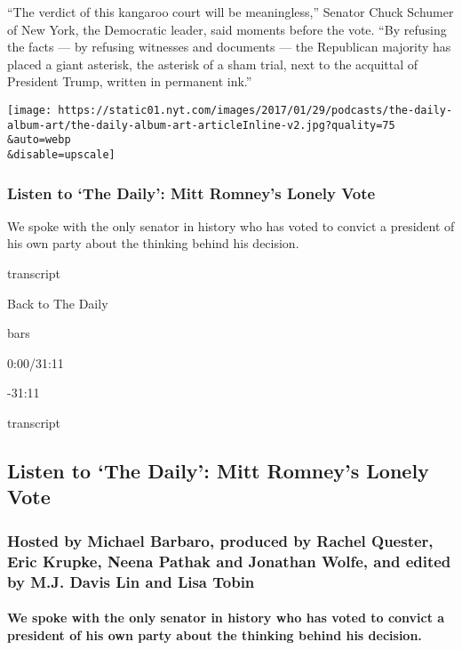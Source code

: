 ``The verdict of this kangaroo court will be meaningless,'' Senator
Chuck Schumer of New York, the Democratic leader, said moments before
the vote. ``By refusing the facts --- by refusing witnesses and
documents --- the Republican majority has placed a giant asterisk, the
asterisk of a sham trial, next to the acquittal of President Trump,
written in permanent ink.''

\texttt{[image: https://static01.nyt.com/images/2017/01/29/podcasts/the-daily-album-art/the-daily-album-art-articleInline-v2.jpg?quality=75\\\&auto=webp\\\&disable=upscale]}

\hypertarget{listen-to-the-daily-mitt-romneys-lonely-vote}{%
\subsubsection{Listen to `The Daily': Mitt Romney's Lonely
Vote}\label{listen-to-the-daily-mitt-romneys-lonely-vote}}

We spoke with the only senator in history who has voted to convict a
president of his own party about the thinking behind his decision.

transcript

Back to The Daily

bars

0:00/31:11

-31:11

transcript

\hypertarget{listen-to-the-daily-mitt-romneys-lonely-vote-1}{%
\subsection{Listen to `The Daily': Mitt Romney's Lonely
Vote}\label{listen-to-the-daily-mitt-romneys-lonely-vote-1}}

\hypertarget{hosted-by-michael-barbaro-produced-by-rachel-quester-eric-krupke-neena-pathak-and-jonathan-wolfe-and-edited-by-mj-davis-lin-and-lisa-tobin}{%
\subsubsection{Hosted by Michael Barbaro, produced by Rachel Quester,
Eric Krupke, Neena Pathak and Jonathan Wolfe, and edited by M.J. Davis
Lin and Lisa
Tobin}\label{hosted-by-michael-barbaro-produced-by-rachel-quester-eric-krupke-neena-pathak-and-jonathan-wolfe-and-edited-by-mj-davis-lin-and-lisa-tobin}}

\hypertarget{we-spoke-with-the-only-senator-in-history-who-has-voted-to-convict-a-president-of-his-own-party-about-the-thinking-behind-his-decision}{%
\paragraph{We spoke with the only senator in history who has voted to
convict a president of his own party about the thinking behind his
decision.}\label{we-spoke-with-the-only-senator-in-history-who-has-voted-to-convict-a-president-of-his-own-party-about-the-thinking-behind-his-decision}}

